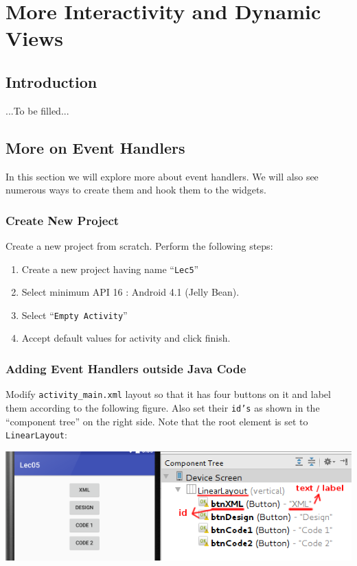 \chapter{More Interactivity and Dynamic Views}

\section{Introduction}
...To be filled...

\section{More on Event Handlers}
In this section we will explore more about event handlers. We will also see numerous ways to create them and hook them to the widgets.

\subsection{Create New Project}
\label{sec:createProj}

Create a new project from scratch. Perform the following steps:
\begin{enumerate}
	\item Create a new project having name ``\texttt{Lec5}''
	\item Select minimum API 16 : Android 4.1 (Jelly Bean).
	\item Select ``\texttt{Empty Activity}''
	\item Accept default values for activity and click finish. \\
\end{enumerate}

\subsection{Adding Event Handlers outside Java Code}
Modify \texttt{activity\_main.xml} layout so that it has four buttons on it and label them according to the following figure. Also set their \texttt{id's} as shown in the ``component tree'' on the right side. Note that the root element is set to \texttt{LinearLayout}:

\begin{center}
	\includegraphics[scale=0.4]{chapters/ch05/images/1}
\end{center}

